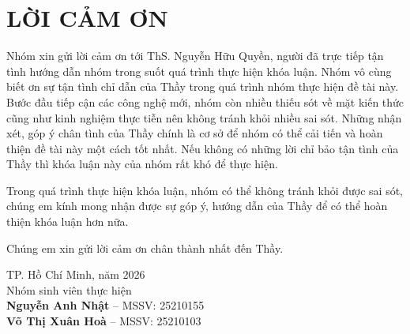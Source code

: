 \chapter*{LỜI CẢM ƠN}

Nhóm xin gửi lời cảm ơn tới ThS. Nguyễn Hữu Quyền, người đã trực tiếp tận tình hướng dẫn nhóm trong suốt quá trình thực hiện khóa luận. Nhóm vô cùng biết ơn sự tận tình chỉ dẫn của Thầy trong quá trình nhóm thực hiện đề tài này. Bước đầu tiếp cận các công nghệ mới, nhóm còn nhiều thiếu sót về mặt kiến thức cũng như kinh nghiệm thực tiễn nên không tránh khỏi nhiều sai sót. Những nhận xét, góp ý chân tình của Thầy chính là cơ sở để nhóm có thể cải tiến và hoàn thiện đề tài này một cách tốt nhất. Nếu không có những lời chỉ bảo tận tình của Thầy thì khóa luận này của nhóm rất khó để thực hiện.

Trong quá trình thực hiện khóa luận, nhóm có thể không tránh khỏi được sai sót, chúng em kính mong nhận được sự góp ý, hướng dẫn của Thầy để có thể hoàn thiện khóa luận hơn nữa.

Chúng em xin gửi lời cảm ơn chân thành nhất đến Thầy.

\vspace*{40pt}
\begin{flushright}
    TP. Hồ Chí Minh, năm 2026\\
    Nhóm sinh viên thực hiện\\[6pt]
    \textbf{Nguyễn Anh Nhật} -- MSSV: 25210155\\
    \textbf{Võ Thị Xuân Hoà} -- MSSV: 25210103
\end{flushright}
